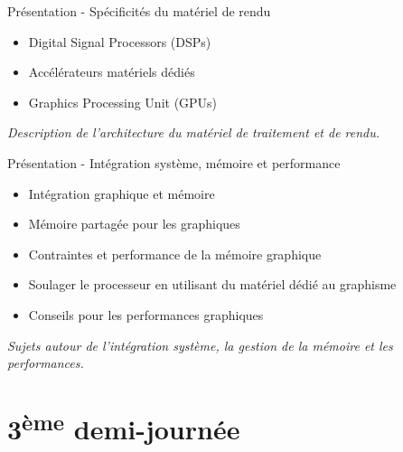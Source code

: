 \documentclass[a4paper,12pt,obeyspaces,spaces,hyphens]{article}
\begin{document}
\feagendatwocolumn
{Présentation - Spécificités du matériel de rendu}
{
  \begin{itemize}
  \item Digital Signal Processors (DSPs)
  \item Accélérateurs matériels dédiés
  \item Graphics Processing Unit (GPUs)
  \end{itemize}
  \vspace{0.5em}
  {\em Description de l'architecture du matériel de traitement et de rendu.}
}
{Présentation - Intégration système, mémoire et performance}
{
  \begin{itemize}
  \item Intégration graphique et mémoire
  \item Mémoire partagée pour les graphiques
  \item Contraintes et performance de la mémoire graphique
  \item Soulager le processeur en utilisant du matériel dédié au graphisme
  \item Conseils pour les performances graphiques
  \end{itemize}
  \vspace{0.5em}
  {\em Sujets autour de l'intégration système, la gestion de la mémoire et les performances.}
}

\section{3\textsuperscript{ème} demi-journée}
\end{document}
